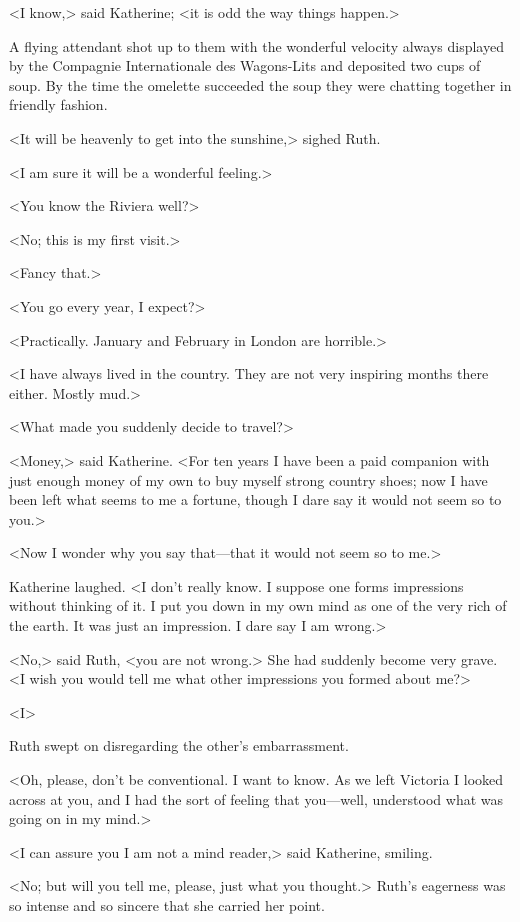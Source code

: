 <I know,> said Katherine; <it is odd the way things happen.>

A flying attendant shot up to them with the wonderful velocity always displayed by the Compagnie Internationale des Wagons-Lits and deposited two cups of soup. By the time the omelette succeeded the soup they were chatting together in friendly fashion.

<It will be heavenly to get into the sunshine,> sighed Ruth.

<I am sure it will be a wonderful feeling.>

<You know the Riviera well?>

<No; this is my first visit.>

<Fancy that.>

<You go every year, I expect?>

<Practically. January and February in London are horrible.>

<I have always lived in the country. They are not very inspiring months there either. Mostly mud.>

<What made you suddenly decide to travel?>

<Money,> said Katherine. <For ten years I have been a paid companion with just enough money of my own to buy myself strong country shoes; now I have been left what seems to me a fortune, though I dare say it would not seem so to you.>

<Now I wonder why you say that—that it would not seem so to me.>

Katherine laughed. <I don't really know. I suppose one forms impressions without thinking of it. I put you down in my own mind as one of the very rich of the earth. It was just an impression. I dare say I am wrong.>

<No,> said Ruth, <you are not wrong.> She had suddenly become very grave. <I wish you would tell me what other impressions you formed about me?>

<I\longdash>

Ruth swept on disregarding the other's embarrassment.

<Oh, please, don't be conventional. I want to know. As we left Victoria I looked across at you, and I had the sort of feeling that you—well, understood what was going on in my mind.>

<I can assure you I am not a mind reader,> said Katherine, smiling.

<No; but will you tell me, please, just what you thought.> Ruth's eagerness was so intense and so sincere that she carried her point.

